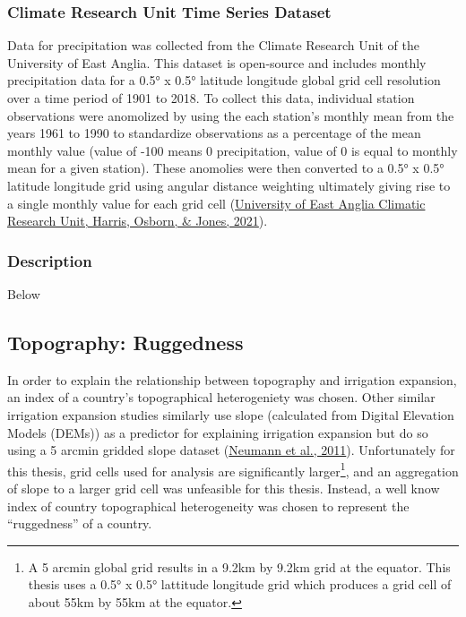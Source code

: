 \documentclass[12pt,twoside]{reedthesis}
\begin{document}
\hypertarget{CRU}{%
\subsubsection{Climate Research Unit Time Series Dataset}\label{CRU}}

Data for precipitation was collected from the Climate Research Unit of the University of East Anglia. This dataset is open-source and includes monthly precipitation data for a 0.5° x 0.5° latitude longitude global grid cell resolution over a time period of 1901 to 2018. To collect this data, individual station observations were anomolized by using the each station's monthly mean from the years 1961 to 1990 to standardize observations as a percentage of the mean monthly value (value of -100 means 0 precipitation, value of 0 is equal to monthly mean for a given station). These anomolies were then converted to a 0.5° x 0.5° latitude longitude grid using angular distance weighting ultimately giving rise to a single monthly value for each grid cell (\protect\hyperlink{ref-universityofeastangliaclimaticresearchunitVersionCRUTS2021}{University of East Anglia Climatic Research Unit, Harris, Osborn, \& Jones, 2021}).

\hypertarget{precipdesc}{%
\subsubsection{Description}\label{precipdesc}}

Below

\hypertarget{rugged}{%
\subsection{Topography: Ruggedness}\label{rugged}}

In order to explain the relationship between topography and irrigation expansion, an index of a country's topographical heterogeniety was chosen. Other similar irrigation expansion studies similarly use slope (calculated from Digital Elevation Models (DEMs)) as a predictor for explaining irrigation expansion but do so using a 5 arcmin gridded slope dataset (\protect\hyperlink{ref-neumannExploringGlobalIrrigation2011}{Neumann et al., 2011}). Unfortunately for this thesis, grid cells used for analysis are significantly larger\footnote{A 5 arcmin global grid results in a 9.2km by 9.2km grid at the equator. This thesis uses a 0.5° x 0.5° lattitude longitude grid which produces a grid cell of about 55km by 55km at the equator.}, and an aggregation of slope to a larger grid cell was unfeasible for this thesis. Instead, a well know index of country topographical heterogeneity was chosen to represent the ``ruggedness'' of a country.
\end{document}

